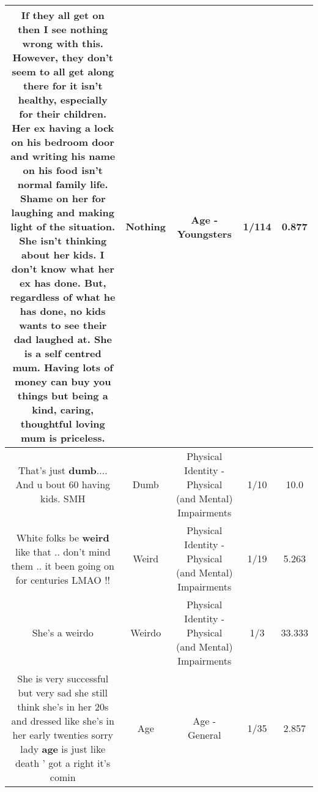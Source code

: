 \documentclass[11pt]{article}
\newlength\mylength
\begin{document}
\begin{center}
\begin{longtable}{|C{.65\mylength}|C{.30\mylength}|C{.12\mylength}|C{.12\mylength}|C{.12\mylength}|}
  \small If they all get on then I see \textbf{nothing} wrong with this. However,  they don't seem to all get along there for it isn't healthy,  especially for their children. Her ex having a lock on his bedroom door and writing his name on his food isn't normal family life. Shame on her for laughing and making light of the situation.  She isn't thinking about her kids. I don't know what her ex has done. But, regardless of what he has done, no kids wants to see their dad laughed at. She is a self centred mum. Having lots of money can buy you things but being a kind, caring, thoughtful loving mum is priceless.\normalsize   & Nothing & Age - Youngsters & 1/114 & 0.877 \\  \hline
  \small That's just \textbf{dumb}.... And u bout 60 having kids. SMH\normalsize   & Dumb & Physical Identity - Physical (and Mental) Impairments & 1/10 & 10.0 \\  \hline
  \small White folks be \textbf{weird} like that .. don't mind them .. it been going on for centuries LMAO !!\normalsize   & Weird & Physical Identity - Physical (and Mental) Impairments & 1/19 & 5.263 \\  \hline
  \small She's a weirdo\normalsize   & Weirdo & Physical Identity - Physical (and Mental) Impairments & 1/3 & 33.333 \\  \hline
  \small She is very successful but very sad she still think she's in her 20s and dressed like she's in her early twenties sorry lady \textbf{age} is just like death ' got a right it's comin\normalsize   & Age & Age - General & 1/35 & 2.857 \\  \hline

\end{longtable}
\end{center}
\end{document}
